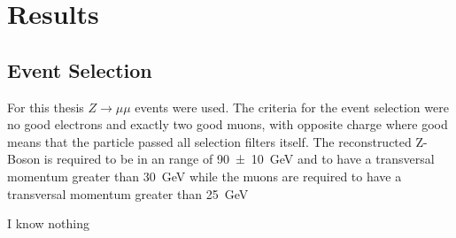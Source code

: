 \chapter{Results}

\section{Event Selection}

For this thesis $Z\rightarrow \mu \mu$ events were used. 
The criteria for the event selection were no good electrons and exactly two good muons, with opposite charge where good means that the particle passed all selection filters itself. The reconstructed Z-Boson is required to be in an range of \SI{90+-10}{\GeV} and to have a transversal momentum greater than \SI{30}{\GeV} while the muons are required to have a transversal momentum greater than \SI{25}{\GeV}
\label{results}

I know nothing